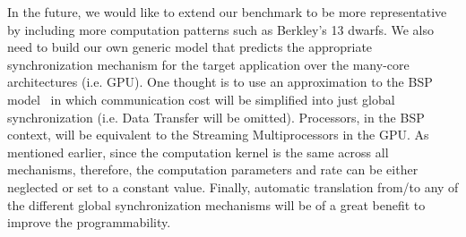 \documentclass[conference]{IEEEtran}
\begin{document}
In the future, we would like to extend our benchmark to be more representative by including more computation patterns such as Berkley's 13 dwarfs. We also need to build our own generic model that predicts the appropriate synchronization mechanism for the target application over the many-core architectures (i.e. GPU). One thought is to use an approximation to the BSP model~\cite{bsp_model} in which communication cost will be simplified into just global synchronization (i.e. Data Transfer will be omitted). Processors, in the BSP context, will be equivalent to the Streaming Multiprocessors in the GPU. As mentioned earlier, since the computation kernel is the same across all mechanisms, therefore, the computation parameters and rate can be either neglected or set to a constant value. Finally, automatic translation from/to any of the different global synchronization mechanisms will be of a great benefit to improve the programmability. 


%
%
\end{document}
